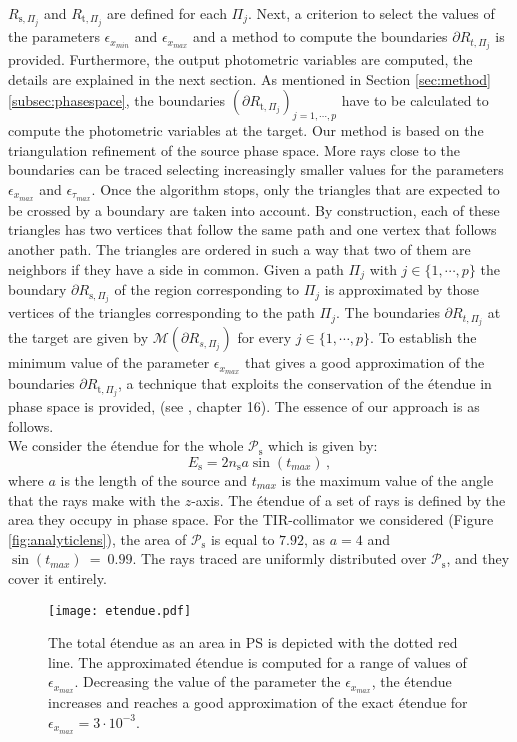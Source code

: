  $R_{\textrm{s}, \Pi_j}$ and $R_{\textrm{t}, \Pi_j}$ are defined for each $\Pi_j$.
Next, a criterion to select the values of the parameters $\epsilon_{x_{min}}$ and $\epsilon_{x_{max}}$ and a method to compute the boundaries $\partial{R_{t, \Pi_j}}$ is provided.
Furthermore, the output photometric variables are computed, the details are explained in the next section.
As mentioned in Section \ref{sec:method}\ref{subsec:phasespace}, the boundaries $(\partial R_{\textrm{t}, \Pi_j})_{j = 1,\cdots, p}$ have to be calculated to compute the photometric variables at the target. Our method is based on the triangulation refinement of the source phase space.
More rays close to the boundaries can be traced selecting increasingly smaller values for the parameters $\epsilon_{x_{max}}$ and $\epsilon_{\tau_{max}}$. Once the algorithm stops, only the triangles that are expected to be crossed by a boundary are taken into account.
By construction, each of these triangles has two vertices that follow the same path and one vertex that follows another path.
The triangles are ordered in such a way that two of them are neighbors if they have a side in common. Given a path $\Pi_j$ with $j \in \{1, \cdots, p\}$ the boundary $\partial R_{\textrm{s}, \Pi_j}$ of the region corresponding to $\Pi_j$ is approximated by those vertices of the triangles corresponding to the path $\Pi_j$.
The boundaries $\partial R_{t, \Pi_j}$ at the target are given by $\mathcal{M}(\partial R_{s, \Pi_j})$ for every $j \in \{1, \cdots, p \}$.
To establish the minimum value of the parameter $\epsilon_{x_{max}}$ that gives a good approximation of the boundaries $\partial R_{\textrm{t}, \Pi_j}$,
a technique that exploits the conservation of the \'{e}tendue in phase space is provided, (see \cite{chaves2008introduction}, chapter 16). The essence of our approach is as follows.\\
\indent We consider the \'{e}tendue for the whole $\mathcal{P}_\textrm{s}$ which is given by:
\begin{equation}\label{etenduesource}
E_{\textrm{s}} = 2n_{\textrm{s}} a \sin(t_{max})\,,
\end{equation}
 where $a$ is the length of the source  and $t_{max}$ is the maximum value of the angle that the rays make with the $z$-axis.
 The \'{e}tendue of a set of rays is defined by the area they occupy in phase space.
 For the TIR-collimator we considered (Figure \ref{fig:analyticlens}), the area of $\mathcal{P}_\textrm{s}$ is equal to $7.92$, as $a = 4$ and $\sin(t_{max}) ~=~ 0.99$.
 The rays traced are uniformly distributed over $\mathcal{P}_\textrm{s}$, and they cover it entirely.
 \begin{figure}[h]
  \begin{center}
  \texttt{[image: etendue.pdf]}
  \end{center}
  \caption{\footnotesize{The total \'{e}tendue as an area in PS is depicted with the dotted red line. The approximated \'{e}tendue is computed for a range of values of $\epsilon_{x_{max}}$. Decreasing the value of the parameter the $\epsilon_{x_{max}}$, the \'{e}tendue increases and reaches a good approximation of the exact \'{e}tendue for $\epsilon_{x_{max}} = 3\cdot 10^{-3}$.
  }}
  \label{fig:etendueTS}
\end{figure}

